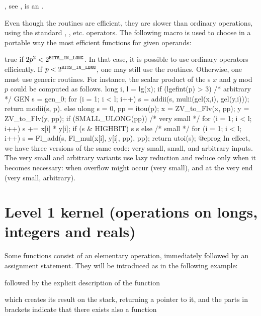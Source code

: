 , see ,
 is an .


Even though the  routines are efficient, they are slower than
ordinary  operations, using the standard \kbd{+}, \kbd{\%}, etc.
operators.
The following macro is used to choose in a portable way the most efficient
functions for given operands:

 true if $2p^2 <2^{\tt BITS\_IN\_LONG}$. In that case, it is
possible to use ordinary operators efficiently. If $p < 2^{\tt BITS\_IN\_LONG}$, one
may still use the  routines. Otherwise, one must use generic
routines. For instance, the scalar product of the s $x$ and $y$ mod
$p$ could be computed as follows.
\bprog
    long i, l = lg(x);
    if (lgefint(p) > 3)
    { /* arbitrary */
      GEN s = gen_0;
      for (i = 1; i < l; i++) s = addii(s, mulii(gel(x,i), gel(y,i)));
      return modii(s, p).
    }
    else
    {
      ulong s = 0, pp = itou(p);
      x = ZV_to_Flv(x, pp);
      y = ZV_to_Flv(y, pp);
      if (SMALL_ULONG(pp))
      { /* very small */
        for (i = 1; i < l; i++)
        {
          s += x[i] * y[i];
          if (s & HIGHBIT) s %
        }
        s %
      }
      else
      { /* small */
        for (i = 1; i < l; i++)
          s = Fl_add(s, Fl_mul(x[i], y[i], pp), pp);
      }
      return utoi(s);
    }
@eprog\noindent
In effect, we have three versions of the same code: very small, small, and
arbitrary inputs. The very small and arbitrary variants use lazy reduction
and reduce only when it becomes necessary: when overflow might occur (very
small), and at the very end (very small, arbitrary).

\section{Level 1 kernel (operations on longs, integers and reals)}

 Some functions consist of an elementary operation,
immediately followed by an assignment statement. They will be introduced as
in the following example:

 followed by the explicit
description of the function


\noindent which creates its result on the stack, returning a  pointer
to it, and the parts in brackets indicate that there exists also a function

